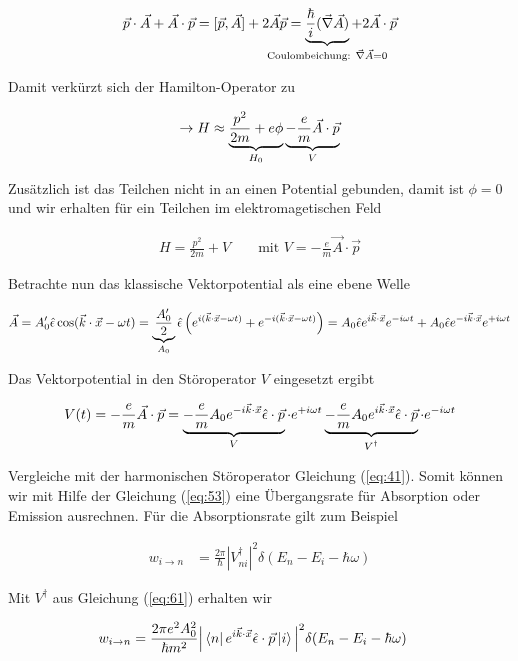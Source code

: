 \begin{align}
  \label{eq:58}
   \vec p \cdot\vec A +  \vec A \cdot\vec p  = [\vec p,\vec A] + 2\vec A\vec p =  \underbr{\frac{\hbar}{i}(\vec \nabla\vec A)}_{\text{Coulombeichung: }\vec \nabla \vec A=0}+ 2\vec A \cdot\vec p 
\end{align}

Damit verkürzt sich der Hamilton-Operator zu

\begin{align}
  \label{eq:55}
  \rightarrow  H \approx \underbr{\frac{p^2}{2m} + e\phi}_{H_0} \underbr{- \frac{e}{m} \vec A\cdot \vec p }_{V}
\end{align}

Zusätzlich ist das Teilchen nicht in an einen Potential gebunden, damit ist \(\phi=0\) und wir erhalten für ein Teilchen im elektromagetischen Feld

\begin{align}
  \label{eq:59}
  H = \frac{p^2}{2m} + V\qquad \text{mit } V = - \frac{e}{m} \vec A\cdot \vec p
\end{align}

Betrachte nun das klassische Vektorpotential als eine ebene Welle

\begin{align}
  \label{eq:60}
  \vec A = A'_0 \hat\epsilon \cos(\vec k\cdot \vec x - \omega t) = \underbr{\frac{A'_0}{2}}_{A_0}\hat\epsilon \left( e^{i(\vec k\cdot \vec x - \omega t) }+ e^{- i(\vec k\cdot \vec x - \omega t) }  \right) =  A_0\hat\epsilon e^{i\vec k\cdot \vec x}e^{ - i\omega t }+  A_0\hat\epsilon e^{- i \vec k\cdot \vec x} e^{ + i \omega t } 
\end{align}

Das Vektorpotential in den Störoperator \(V\) eingesetzt ergibt

\begin{align}
  \label{eq:61}
  V(t) = - \frac{e}{m} \vec A\cdot \vec p = \underbr{- \frac{e}{m} A_0 e^{- i \vec k\cdot \vec x} \hat\epsilon\cdot \vec p}_{V} \cdot e^{ + i \omega t } \underbr{- \frac{e}{m}  A_0 e^{i\vec k\cdot \vec x} \hat\epsilon \cdot \vec p }_{V^\dagger} \cdot e^{ - i\omega t }
\end{align}

Vergleiche mit der harmonischen Störoperator Gleichung (\ref{eq:41}). Somit können wir mit Hilfe der Gleichung (\ref{eq:53}) eine Übergangsrate für Absorption oder Emission ausrechnen. Für die Absorptionsrate gilt zum Beispiel

\begin{align}
  \label{eq:62}
   w_{i\rightarrow n} &= \frac{2\pi}{\hbar}|V_{ni}^\dagger|^2 \delta(E_n - E_i - \hbar\omega)
\end{align}

Mit \(V^\dagger\) aus Gleichung (\ref{eq:61}) erhalten wir

\begin{align}
  \label{eq:63}
  w_{i\rightarrow n} &= \frac{2\pi e^2 A_0^2}{\hbar m^2}\Big| \left\langle n \right| e^{i\vec k\cdot \vec x} \hat\epsilon \cdot \vec p \left| i \right\rangle \Big|^2 \delta(E_n - E_i - \hbar\omega)
\end{align}







